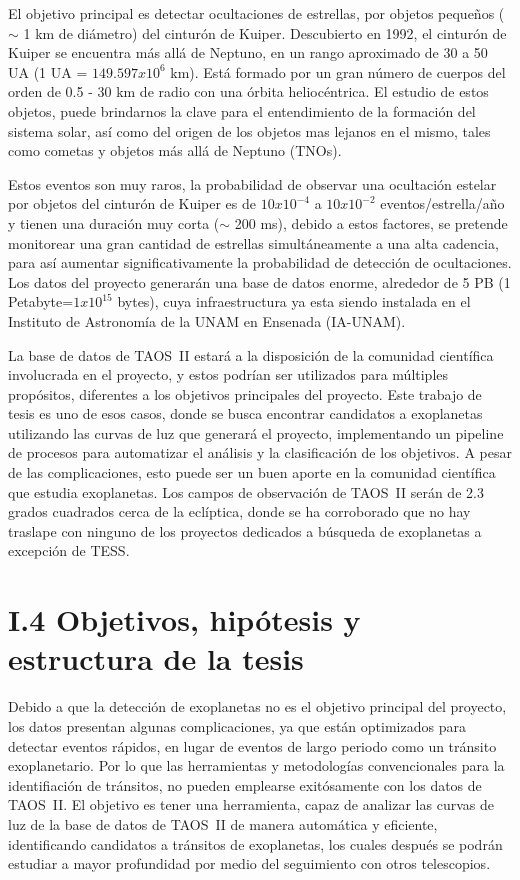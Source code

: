 El objetivo principal es detectar ocultaciones de estrellas, por objetos pequeños ($\sim$ 1 km de diámetro) del cinturón de Kuiper. Descubierto en 1992, el cinturón de Kuiper \citep{luu2002kuiper} se encuentra más allá de Neptuno, en un rango aproximado de 30 a 50 UA (1 UA = $ 149.597x10^{6}$ km). Está formado por un gran número de cuerpos del orden de 0.5 - 30 km de radio con una órbita heliocéntrica. El estudio de estos objetos, puede brindarnos la clave para el entendimiento de la formación del sistema solar, así como del origen de los objetos mas lejanos en el mismo, tales como cometas y objetos más allá de Neptuno (TNOs).

Estos eventos son muy raros, la probabilidad de observar una ocultación estelar por objetos del cinturón de Kuiper es de $10x10^{-4}$ a $10x10^{-2}$ eventos/estrella/año y tienen una duración muy corta ($\sim$ 200 ms), debido a estos factores, se pretende monitorear una gran cantidad de estrellas simultáneamente a una alta cadencia, para así aumentar significativamente la probabilidad de detección de ocultaciones. Los datos del proyecto generarán una base de datos enorme, alrededor de 5 PB (1 Petabyte=$ 1x10^{15}$ bytes), cuya infraestructura ya esta siendo instalada en el Instituto de Astronomía de la UNAM en Ensenada (IA-UNAM). 

La base de datos de TAOS~II estará a la disposición de la comunidad científica involucrada en el proyecto, y estos podrían ser utilizados para múltiples propósitos, diferentes a los objetivos principales del proyecto. Este trabajo de tesis es uno de esos casos, donde se busca encontrar candidatos a exoplanetas utilizando las curvas de luz que generará el proyecto, implementando un pipeline de procesos para automatizar el análisis y la clasificación de los objetivos. A pesar de las complicaciones, esto puede ser un buen aporte en la comunidad científica que estudia exoplanetas. Los campos de observación de TAOS~II serán de 2.3 grados cuadrados cerca de la eclíptica, donde se ha corroborado que no hay traslape con ninguno de los proyectos dedicados a búsqueda de exoplanetas a excepción de TESS.


\section*{I.4 Objetivos, hipótesis y estructura de la tesis}


Debido a que la detección de exoplanetas no es el objetivo principal del proyecto, los datos presentan algunas complicaciones, ya que están optimizados para detectar eventos rápidos, en lugar de eventos de largo periodo como un tránsito exoplanetario. Por lo que las herramientas y metodologías convencionales para la identifiación de tránsitos, no pueden emplearse exitósamente con los datos de TAOS~II. El objetivo es tener una herramienta, capaz de analizar las curvas de luz de la base de datos de TAOS~II de manera automática y eficiente, identificando candidatos a tránsitos de exoplanetas, los cuales después se podrán estudiar a mayor profundidad por medio del seguimiento con otros telescopios.

